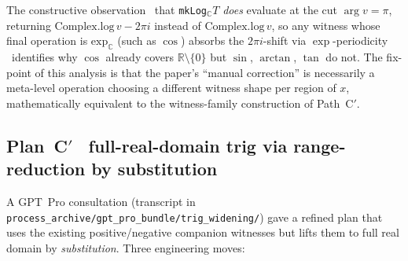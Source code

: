 \documentclass[11pt]{article}
\theoremstyle{plain}
\theoremstyle{definition}
\begin{document}
The constructive observation \textemdash\ that \texttt{mkLog}$_{\mathbb{C}}T$
\emph{does} evaluate at the cut $\arg v = \pi$, returning
$\mathrm{Complex.log}\,v - 2\pi i$ instead of
$\mathrm{Complex.log}\,v$, so any witness whose final operation is
$\mathrm{exp}_{\mathbb{C}}$ (such as $\cos$) absorbs the
$2\pi i$-shift via $\exp$-periodicity \textemdash\ identifies why $\cos$
already covers $\mathbb{R}\setminus\{0\}$ but $\sin$, $\arctan$, $\tan$
do not. The fix-point of this analysis is that the paper's
``manual correction'' is necessarily a meta-level operation choosing a
different witness shape per region of $x$, mathematically equivalent
to the witness-family construction of Path~C$'$.

\subsection*{\texorpdfstring{Plan~C$'$ \textemdash\ full-real-domain trig via
range-reduction by substitution}{Plan C-prime --- full-real-domain trig via range-reduction by substitution}}

A GPT~Pro consultation (transcript in
\texttt{process\_archive/gpt\_pro\_bundle/trig\_widening/}) gave
a refined plan that uses the existing positive/negative companion
witnesses but lifts them to full real domain by \emph{substitution}.
Three engineering moves:
\end{document}
